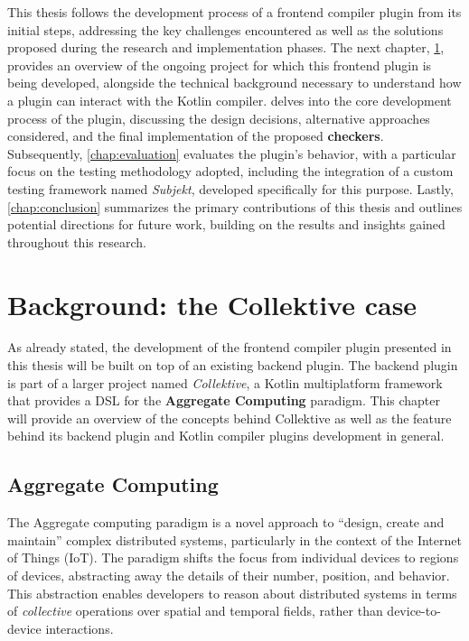 \documentclass[12pt,a4paper,openright,twoside]{book}
\begin{document}
This thesis follows the development process of a frontend compiler plugin from
its initial steps, addressing the key challenges encountered as well as the
solutions proposed during the research and implementation phases. The next
chapter, \cref{chap:background}, provides an overview of the ongoing project for
which this frontend plugin is being developed, alongside the technical
background necessary to understand how a plugin can interact with the Kotlin
compiler.
%
 delves into the core development process of the plugin,
discussing the design decisions, alternative approaches considered, and the
final implementation of the proposed \textbf{checkers}. Subsequently,
\cref{chap:evaluation} evaluates the plugin’s behavior, with a particular focus
on the testing methodology adopted, including the integration of a custom
testing framework named \emph{Subjekt}, developed specifically for this purpose.
%
Lastly, \cref{chap:conclusion} summarizes the primary contributions of this
thesis and outlines potential directions for future work, building on the
results and insights gained throughout this research.

\chapter{Background: the Collektive case}
\label{chap:background}

As already stated, the development of the frontend compiler plugin presented in
this thesis will be built on top of an existing backend plugin. The backend
plugin is part of a larger project named \emph{Collektive}, a Kotlin
multiplatform framework that provides a \ac{DSL} for the \textbf{Aggregate
Computing} \cite{Beal2015} paradigm. This chapter will provide an overview of
the concepts behind Collektive as well as the feature behind its backend plugin
and Kotlin compiler plugins development in general.

\section{Aggregate Computing}

The Aggregate computing paradigm is a novel approach to ``design, create and
maintain'' \cite{Beal2015} complex distributed systems, particularly in the 
context of the Internet of Things (IoT). The paradigm shifts the focus from
individual devices to regions of devices, abstracting away the details of their
number, position, and behavior. This abstraction enables developers to reason
about distributed systems in terms of \emph{collective} operations over spatial and
temporal fields, rather than device-to-device interactions. 
\end{document}
